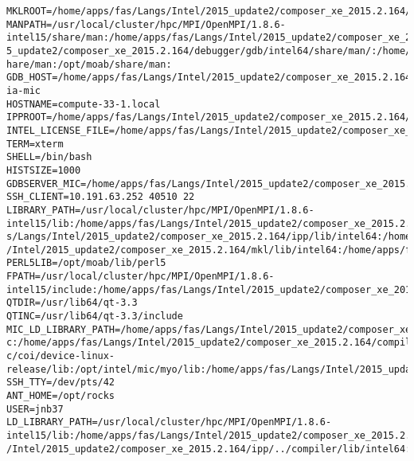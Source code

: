\documentclass[11pt]{article}
\begin{document}
\begin{verbatim}
MKLROOT=/home/apps/fas/Langs/Intel/2015_update2/composer_xe_2015.2.164/mkl
MANPATH=/usr/local/cluster/hpc/MPI/OpenMPI/1.8.6-intel15/share/man:/home/apps/fas/Langs/Intel/2015_update2/composer_xe_2015.2.164/man/en_US:/home/apps/fas/Langs/Intel/201
5_update2/composer_xe_2015.2.164/debugger/gdb/intel64/share/man/:/home/apps/fas/Langs/Intel/2015_update2/composer_xe_2015.2.164/debugger/gdb/intel64_mic/share/man/:/usr/s
hare/man:/opt/moab/share/man:
GDB_HOST=/home/apps/fas/Langs/Intel/2015_update2/composer_xe_2015.2.164/debugger/gdb/intel64_mic/bin/gdb-ia-mic
HOSTNAME=compute-33-1.local
IPPROOT=/home/apps/fas/Langs/Intel/2015_update2/composer_xe_2015.2.164/ipp
INTEL_LICENSE_FILE=/home/apps/fas/Langs/Intel/2015_update2/composer_xe_2015.2.164/licenses:/opt/intel/licenses:/home/apps/fas/Licenses/intel_site.lic
TERM=xterm
SHELL=/bin/bash
HISTSIZE=1000
GDBSERVER_MIC=/home/apps/fas/Langs/Intel/2015_update2/composer_xe_2015.2.164/debugger/gdb/target/mic/bin/gdbserver
SSH_CLIENT=10.191.63.252 40510 22
LIBRARY_PATH=/usr/local/cluster/hpc/MPI/OpenMPI/1.8.6-intel15/lib:/home/apps/fas/Langs/Intel/2015_update2/composer_xe_2015.2.164/ipp/../compiler/lib/intel64:/home/apps/fa
s/Langs/Intel/2015_update2/composer_xe_2015.2.164/ipp/lib/intel64:/home/apps/fas/Langs/Intel/2015_update2/composer_xe_2015.2.164/compiler/lib/intel64:/home/apps/fas/Langs
/Intel/2015_update2/composer_xe_2015.2.164/mkl/lib/intel64:/home/apps/fas/Langs/Intel/2015_update2/composer_xe_2015.2.164/tbb/lib/intel64/gcc4.4
PERL5LIB=/opt/moab/lib/perl5
FPATH=/usr/local/cluster/hpc/MPI/OpenMPI/1.8.6-intel15/include:/home/apps/fas/Langs/Intel/2015_update2/composer_xe_2015.2.164/mkl/include
QTDIR=/usr/lib64/qt-3.3
QTINC=/usr/lib64/qt-3.3/include
MIC_LD_LIBRARY_PATH=/home/apps/fas/Langs/Intel/2015_update2/composer_xe_2015.2.164/mpirt/lib/mic:/home/apps/fas/Langs/Intel/2015_update2/composer_xe_2015.2.164/ipp/lib/mi
c:/home/apps/fas/Langs/Intel/2015_update2/composer_xe_2015.2.164/compiler/lib/mic:/home/apps/fas/Langs/Intel/2015_update2/composer_xe_2015.2.164/mkl/lib/mic:/opt/intel/mi
c/coi/device-linux-release/lib:/opt/intel/mic/myo/lib:/home/apps/fas/Langs/Intel/2015_update2/composer_xe_2015.2.164/tbb/lib/mic
SSH_TTY=/dev/pts/42
ANT_HOME=/opt/rocks
USER=jnb37
LD_LIBRARY_PATH=/usr/local/cluster/hpc/MPI/OpenMPI/1.8.6-intel15/lib:/home/apps/fas/Langs/Intel/2015_update2/composer_xe_2015.2.164/mpirt/lib/intel64:/home/apps/fas/Langs
/Intel/2015_update2/composer_xe_2015.2.164/ipp/../compiler/lib/intel64:/home/apps/fas/Langs/Intel/2015_update2/composer_xe_2015.2.164/ipp/lib/intel64:/home/apps/fas/Langs

\end{verbatim}
\end{document}
